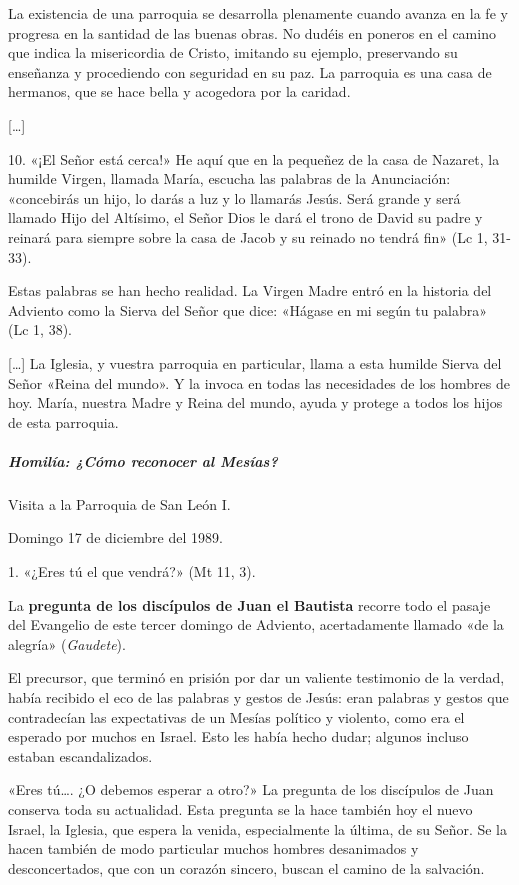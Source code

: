 \documentclass[]{article}
\let\oldsubparagraph\subparagraph
\renewcommand{\subparagraph}[1]{\oldsubparagraph{#1}\mbox{}}
\begin{document}
La existencia de una parroquia se desarrolla plenamente cuando avanza en
la fe y progresa en la santidad de las buenas obras. No dudéis en
poneros en el camino que indica la misericordia de Cristo, imitando su
ejemplo, preservando su enseñanza y procediendo con seguridad en su paz.
La parroquia es una casa de hermanos, que se hace bella y acogedora por
la caridad.

[\ldots{}]

10. «¡El Señor está cerca!» He aquí que en la pequeñez de la casa de
Nazaret, la humilde Virgen, llamada María, escucha las palabras de la
Anunciación: «concebirás un hijo, lo darás a luz y lo llamarás Jesús.
Será grande y será llamado Hijo del Altísimo, el Señor Dios le dará el
trono de David su padre y reinará para siempre sobre la casa de Jacob y
su reinado no tendrá fin» (Lc 1, 31-33).

Estas palabras se han hecho realidad. La Virgen Madre entró en la
historia del Adviento como la Sierva del Señor que dice: «Hágase en mi
según tu palabra» (Lc 1, 38).

{[}\ldots{}{]} La Iglesia, y vuestra parroquia en particular, llama a
esta humilde Sierva del Señor «Reina del mundo». Y la invoca en todas
las necesidades de los hombres de hoy. María, nuestra Madre y Reina del
mundo, ayuda y protege a todos los hijos de esta parroquia.

\subparagraph{Homilía: ¿Cómo reconocer al
Mesías?}\label{homiluxeda-cuxf3mo-reconocer-al-mesuxedas}

Visita a la Parroquia de San León I.

Domingo 17 de diciembre del 1989.

1. «¿Eres tú el que vendrá?» (Mt 11, 3).

La \textbf{pregunta de los discípulos de Juan el Bautista} recorre todo
el pasaje del Evangelio de este tercer domingo de Adviento,
acertadamente llamado «de la alegría» (\emph{Gaudete}).

El precursor, que terminó en prisión por dar un valiente testimonio de
la verdad, había recibido el eco de las palabras y gestos de Jesús: eran
palabras y gestos que contradecían las expectativas de un Mesías
político y violento, como era el esperado por muchos en Israel. Esto les
había hecho dudar; algunos incluso estaban escandalizados.

«Eres tú\ldots{}. ¿O debemos esperar a otro?» La pregunta de los
discípulos de Juan conserva toda su actualidad. Esta pregunta se la hace
también hoy el nuevo Israel, la Iglesia, que espera la venida,
especialmente la última, de su Señor. Se la hacen también de modo
particular muchos hombres desanimados y desconcertados, que con un
corazón sincero, buscan el camino de la salvación.
\end{document}
